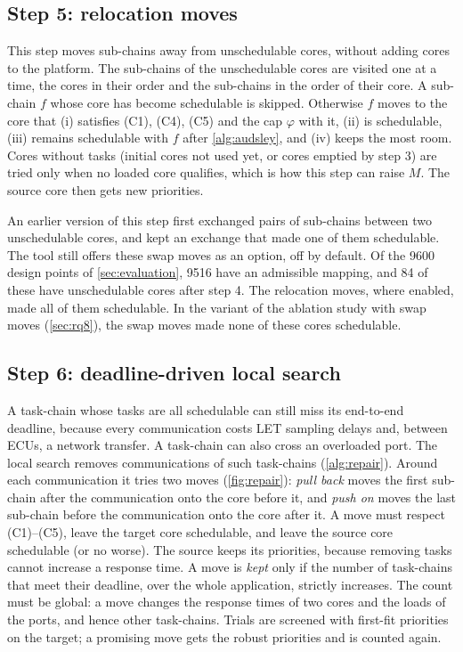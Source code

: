 \subsection{Step 5: relocation moves}
\label{sec:placement}

This step moves sub-chains away from unschedulable cores, without adding
cores to the platform. The sub-chains of the unschedulable cores are
visited one at a time, the cores in their order and the sub-chains in the
order of their core. A sub-chain $f$ whose core has become schedulable is
skipped. Otherwise $f$ moves to the core that (i) satisfies (C1), (C4),
(C5) and the cap $\varphi$ with it, (ii) is schedulable, (iii) remains
schedulable with $f$ after \cref{alg:audsley}, and (iv) keeps the most
room. Cores without tasks (initial cores not used yet, or cores emptied
by step 3) are tried only when no loaded core qualifies, which is how
this step can raise $M$. The source core then gets new priorities.

\begin{remark}
An earlier version of this step first exchanged pairs of sub-chains
between two unschedulable cores, and kept an exchange that made one of
them schedulable. The tool still offers these swap moves as an option, off
by default. Of the 9600 design points of \cref{sec:evaluation}, 9516
have an admissible mapping, and 84 of these have unschedulable cores
after step 4. The relocation moves, where enabled, made all of them
schedulable. In the variant of the ablation study with swap moves
(\cref{sec:rq8}), the swap moves made none of these cores schedulable.
\end{remark}

\subsection{Step 6: deadline-driven local search}
\label{sec:repair}

A task-chain whose tasks are all schedulable can still miss its
end-to-end deadline, because every communication costs LET sampling delays
and, between ECUs, a network transfer. A task-chain can also cross an
overloaded port. The local search removes communications of such
task-chains (\cref{alg:repair}). Around each communication it tries two
moves (\cref{fig:repair}): \emph{pull back} moves the first sub-chain after
the communication onto the core before it, and \emph{push on} moves the
last sub-chain before the communication onto the core after it. A move
must respect (C1)--(C5), leave the target core schedulable, and leave the
source core schedulable (or no worse). The source keeps its priorities,
because removing tasks cannot increase a response time. A move is
\emph{kept} only if the number of task-chains that meet their deadline,
over the whole application, strictly increases. The count must be global:
a move changes the response times of two cores and the loads of the ports,
and hence other task-chains. Trials are screened with first-fit priorities
on the target; a promising move gets the robust priorities and is counted
again.

